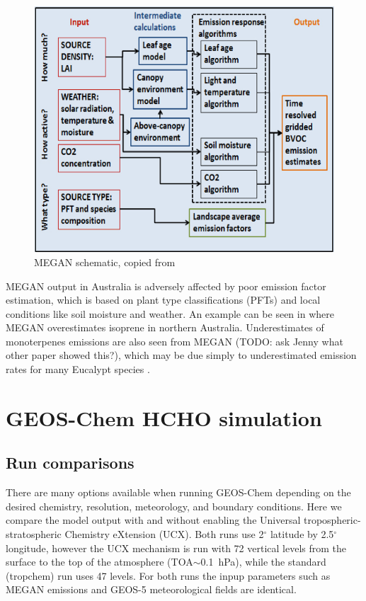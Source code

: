     \begin{figure}[!htbp]
      \includegraphics[width=\textwidth]{Figures/MEGANmodel_img.jpg}
      \caption{MEGAN schematic, copied from \citet{Megan_Website}}
      \label{ch_HCHO:fig:megan_schematic}
    \end{figure}

    MEGAN output in Australia is adversely affected by poor emission factor estimation, which is based on plant type classifications (PFTs) and local conditions like soil moisture and weather. 
    An example can be seen in \citet{Muller2008} where MEGAN overestimates isoprene in northern Australia.
    Underestimates of monoterpenes emissions are also seen from MEGAN (TODO: ask Jenny what other paper showed this?), which may be due simply to underestimated emission rates for many Eucalypt species \citep{Winters2009}.
    
\section{GEOS-Chem HCHO simulation}
\label{ch_HCHO:sec:modelHCHO}
  \subsection{Run comparisons}
    
    There are many options available when running GEOS-Chem depending on the desired chemistry, resolution, meteorology, and boundary conditions.
    Here we compare the model output with and without enabling the Universal tropospheric-stratospheric Chemistry eXtension (UCX).
    Both runs use 2$^{\circ}$ latitude by 2.5$^{\circ}$ longitude, however the UCX mechanism is run with 72 vertical levels from the surface to the top of the atmosphere (TOA$\sim$0.1~hPa), while the standard (tropchem) run uses 47 levels.
    For both runs the inpup parameters such as MEGAN emissions and GEOS-5 meteorological fields are identical.
    

